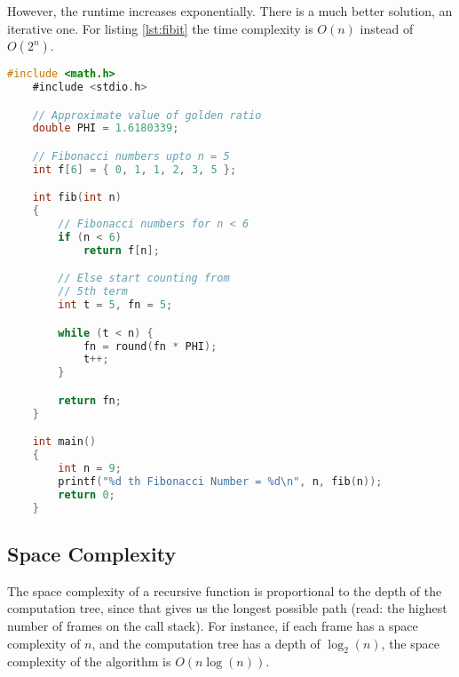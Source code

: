 However, the runtime increases exponentially.
There is a much better solution, an iterative one.
For listing \ref{lst:fibit} the time complexity is $O(n)$
instead of $O(2^n)$.

\begin{lstlisting}[language=C, label={lst:fibit}, caption=Singly Linked List Node Structure]
    #include <math.h>
    #include <stdio.h>

    // Approximate value of golden ratio
    double PHI = 1.6180339;

    // Fibonacci numbers upto n = 5
    int f[6] = { 0, 1, 1, 2, 3, 5 };

    int fib(int n)
    {
        // Fibonacci numbers for n < 6
        if (n < 6)
            return f[n];

        // Else start counting from
        // 5th term
        int t = 5, fn = 5;

        while (t < n) {
            fn = round(fn * PHI);
            t++;
        }

        return fn;
    }

    int main()
    {
        int n = 9;
        printf("%d th Fibonacci Number = %d\n", n, fib(n));
        return 0;
    }
\end{lstlisting}

\subsection{Space Complexity}

The space complexity of a recursive function is proportional to
the depth of the computation tree, since that gives us the longest
possible path (read: the highest number of frames on the call stack).
For instance, if each frame has a space complexity of $n$, and the
computation tree has a depth of $\log_2(n)$, the space complexity
of the algorithm is $O(n\log(n))$.